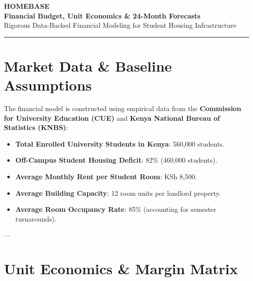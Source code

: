 \documentclass[11pt,a4paper]{article}
\begin{document}
\begin{center}
    {\Huge \bfseries \color{primary} HOMEBASE} \\[0.5em]
    {\Large \bfseries Financial Budget, Unit Economics \& 24-Month Forecasts} \\[0.25em]
    {\small Rigorous Data-Backed Financial Modeling for Student Housing Infrastructure} \\[0.5em]
    \rule{\textwidth}{1pt}
\end{center}

\vspace{1em}

\section{Market Data \& Baseline Assumptions}

The financial model is constructed using empirical data from the \textbf{Commission for University Education (CUE)} and \textbf{Kenya National Bureau of Statistics (KNBS)}:

\begin{itemize}[noitemsep]
    \item \textbf{Total Enrolled University Students in Kenya}: 560,000 students.
    \item \textbf{Off-Campus Student Housing Deficit}: 82\% (460,000 students).
    \item \textbf{Average Monthly Rent per Student Room}: KSh 8,500.
    \item \textbf{Average Building Capacity}: 12 room units per landlord property.
    \item \textbf{Average Room Occupancy Rate}: 85\% (accounting for semester turnarounds).
\end{itemize}

---

\section{Unit Economics \& Margin Matrix}
\end{document}
